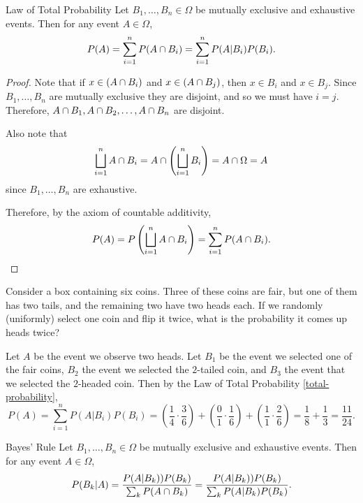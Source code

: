 \begin{thm}Law of Total Probability\label{total-probability}\proofbreak
    Let $B_1, \ldots, B_n \in \Omega$ be mutually exclusive and exhaustive events. Then for any event $A \in \Omega$,
    \[P(A) = \sum_{i=1}^{n}P(A \cap B_i) = \sum_{i=1}^{n}P(A | B_i)P(B_i).\]
\end{thm}

\begin{proof}
    Note that if $x \in (A \cap B_i)$ and $x \in (A \cap B_j)$, then $x \in B_i$ and $x \in B_j$. Since $B_1, \ldots, B_n$ are mutually exclusive they are disjoint, and so we must have $i = j$. Therefore, $A \cap B_1, A \cap B_2, \ldots, A \cap B_n$ are disjoint.

    Also note that
    \begin{align*}
        \bigsqcup_{i=1}^{n}A \cap B_i = A \cap \left(\bigsqcup_{i=1}^{n}B_i\right) = A \cap \Omega = A
    \end{align*}
    since $B_1, \ldots, B_n$ are exhaustive.

    Therefore, by the axiom of countable additivity,
    \begin{align*}
        P(A) = P\left(\bigsqcup_{i=1}^{n}A \cap B_i\right) = \sum_{i=1}^{n}P(A \cap B_i).
    \end{align*}
\end{proof}

\begin{exmp}
    Consider a box containing six coins. Three of these coins are fair, but one of them has two tails, and the remaining two have two heads each. If we randomly (uniformly) select one coin and flip it twice, what is the probability it comes up heads twice?

    Let $A$ be the event we observe two heads. Let $B_1$ be the event we selected one of the fair coins, $B_2$ the event we selected the $2$-tailed coin, and $B_3$ the event that we selected the $2$-headed coin. Then by the Law of Total Probability \ref{total-probability},
    \[P(A) = \sum_{i=1}^{n}P(A | B_i)P(B_i) = \left(\frac{1}{4}\cdot\frac{3}{6}\right) + \left(\frac{0}{1}\cdot\frac{1}{6}\right) + \left(\frac{1}{1}\cdot\frac{2}{6}\right) = \frac{1}{8} + \frac{1}{3} = \frac{11}{24}.\]
\end{exmp}

\begin{thm}{Bayes' Rule}\proofbreak
    Let $B_1, \ldots, B_n \in \Omega$ be mutually exclusive and exhaustive events. Then for any event $A \in \Omega$,
    \begin{align*}
        P(B_k | A) = \frac{P(A|B_k))P(B_k)}{\sum_{k}P(A \cap B_k)} = \frac{P(A|B_k))P(B_k)}{\sum_{k}P(A | B_k)P(B_k)}.
    \end{align*}
\end{thm}

